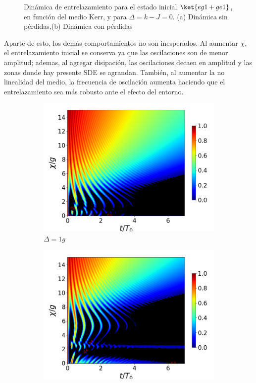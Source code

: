 \begin{figure}[h!]
\begin{subfigure}{0.49\textwidth}
        \caption{}
        \label{fig4:concu x 1 dis}
    \end{subfigure}
    \caption{Dinámica de entrelazamiento para el estado inicial $\ket{eg1+ge1}$, en función del medio Kerr, y para $\Delta=k-J=0$. (a) Dinámica sin pérdidas,(b) Dinámica con pérdidas}
    \label{fig4:concu x 1}
\end{figure}
Aparte de esto, los demás comportamientos no son inesperados. Al aumentar $\chi$, el entrelazamiento inicial se conserva ya que las oscilaciones son de menor amplitud; ademas, al agregar disipación, las oscilaciones decaen en amplitud y las zonas donde hay presente SDE se agrandan. También, al aumentar la no linealidad del medio, la frecuencia de oscilación aumenta haciendo que el entrelazamiento sea más robusto ante el efecto del entorno.
\begin{figure}[h!]
    \centering
    \begin{subfigure}{0.49\textwidth}
        \includegraphics[width=\textwidth]{figuras/ch4/concu/chi/eg1+ge1 d=1.0g k=0.0g J=0.0g gamma=0.25g concu chi dis.png}
        \caption{$\Delta=1g$}
        \label{fig4:concu x 1 d1}
    \end{subfigure}
    \hfill
    \begin{subfigure}{0.49\textwidth}
        \includegraphics[width=\textwidth]{figuras/ch4/concu/chi/eg1+ge1 d=5.0g k=0.0g J=0.0g gamma=0.25g concu chi dis.png}

\end{subfigure}
\end{figure}
